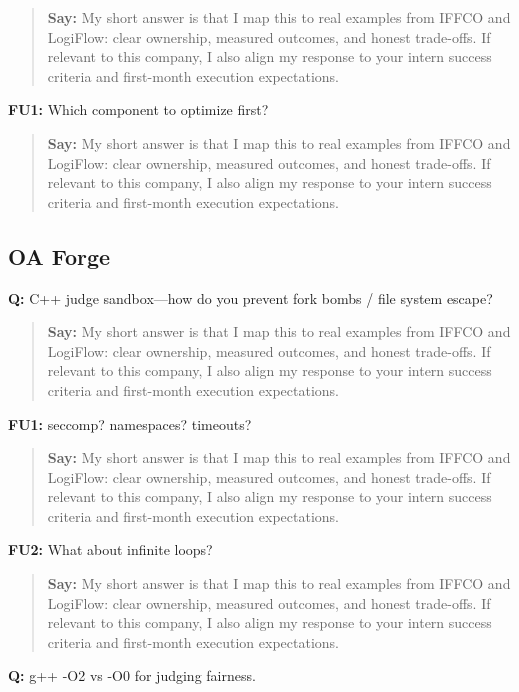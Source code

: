 \documentclass[9pt,a4paper]{article}
\begin{document}
\begin{quote}\small\textbf{Say:} My short answer is that I map this to real examples from IFFCO and LogiFlow: clear ownership, measured outcomes, and honest trade-offs. If relevant to this company, I also align my response to your intern success criteria and first-month execution expectations.\end{quote}
\vspace{2mm}
\textbf{FU1:} Which component to optimize first?

\begin{quote}\small\textbf{Say:} My short answer is that I map this to real examples from IFFCO and LogiFlow: clear ownership, measured outcomes, and honest trade-offs. If relevant to this company, I also align my response to your intern success criteria and first-month execution expectations.\end{quote}
\vspace{2mm}
\subsection{OA Forge}
\textbf{Q:} C++ judge sandbox---how do you prevent fork bombs / file system escape?

\begin{quote}\small\textbf{Say:} My short answer is that I map this to real examples from IFFCO and LogiFlow: clear ownership, measured outcomes, and honest trade-offs. If relevant to this company, I also align my response to your intern success criteria and first-month execution expectations.\end{quote}
\vspace{2mm}
\textbf{FU1:} seccomp? namespaces? timeouts?

\begin{quote}\small\textbf{Say:} My short answer is that I map this to real examples from IFFCO and LogiFlow: clear ownership, measured outcomes, and honest trade-offs. If relevant to this company, I also align my response to your intern success criteria and first-month execution expectations.\end{quote}
\vspace{2mm}
\textbf{FU2:} What about infinite loops?

\begin{quote}\small\textbf{Say:} My short answer is that I map this to real examples from IFFCO and LogiFlow: clear ownership, measured outcomes, and honest trade-offs. If relevant to this company, I also align my response to your intern success criteria and first-month execution expectations.\end{quote}
\vspace{2mm}
\textbf{Q:} g++ -O2 vs -O0 for judging fairness.
\end{document}
